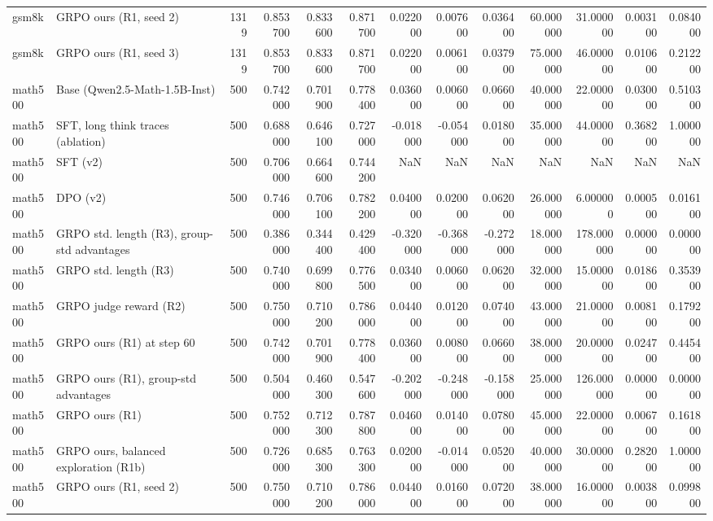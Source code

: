 \begin{table}
\begin{tabular}{llrrrrrrrrrrr}
gsm8k & GRPO ours (R1, seed 2) & 1319 & 0.853700 & 0.833600 & 0.871700 & 0.022000 & 0.007600 & 0.036400 & 60.000000 & 31.000000 & 0.003100 & 0.084000 \\
gsm8k & GRPO ours (R1, seed 3) & 1319 & 0.853700 & 0.833600 & 0.871700 & 0.022000 & 0.006100 & 0.037900 & 75.000000 & 46.000000 & 0.010600 & 0.212200 \\
math500 & Base (Qwen2.5-Math-1.5B-Inst) & 500 & 0.742000 & 0.701900 & 0.778400 & 0.036000 & 0.006000 & 0.066000 & 40.000000 & 22.000000 & 0.030000 & 0.510300 \\
math500 & SFT, long think traces (ablation) & 500 & 0.688000 & 0.646100 & 0.727000 & -0.018000 & -0.054000 & 0.018000 & 35.000000 & 44.000000 & 0.368200 & 1.000000 \\
math500 & SFT (v2) & 500 & 0.706000 & 0.664600 & 0.744200 & NaN & NaN & NaN & NaN & NaN & NaN & NaN \\
math500 & DPO (v2) & 500 & 0.746000 & 0.706100 & 0.782200 & 0.040000 & 0.020000 & 0.062000 & 26.000000 & 6.000000 & 0.000500 & 0.016100 \\
math500 & GRPO std. length (R3), group-std advantages & 500 & 0.386000 & 0.344400 & 0.429400 & -0.320000 & -0.368000 & -0.272000 & 18.000000 & 178.000000 & 0.000000 & 0.000000 \\
math500 & GRPO std. length (R3) & 500 & 0.740000 & 0.699800 & 0.776500 & 0.034000 & 0.006000 & 0.062000 & 32.000000 & 15.000000 & 0.018600 & 0.353900 \\
math500 & GRPO judge reward (R2) & 500 & 0.750000 & 0.710200 & 0.786000 & 0.044000 & 0.012000 & 0.074000 & 43.000000 & 21.000000 & 0.008100 & 0.179200 \\
math500 & GRPO ours (R1) at step 60 & 500 & 0.742000 & 0.701900 & 0.778400 & 0.036000 & 0.008000 & 0.066000 & 38.000000 & 20.000000 & 0.024700 & 0.445400 \\
math500 & GRPO ours (R1), group-std advantages & 500 & 0.504000 & 0.460300 & 0.547600 & -0.202000 & -0.248000 & -0.158000 & 25.000000 & 126.000000 & 0.000000 & 0.000000 \\
math500 & GRPO ours (R1) & 500 & 0.752000 & 0.712300 & 0.787800 & 0.046000 & 0.014000 & 0.078000 & 45.000000 & 22.000000 & 0.006700 & 0.161800 \\
math500 & GRPO ours, balanced exploration (R1b) & 500 & 0.726000 & 0.685300 & 0.763300 & 0.020000 & -0.014000 & 0.052000 & 40.000000 & 30.000000 & 0.282000 & 1.000000 \\
math500 & GRPO ours (R1, seed 2) & 500 & 0.750000 & 0.710200 & 0.786000 & 0.044000 & 0.016000 & 0.072000 & 38.000000 & 16.000000 & 0.003800 & 0.099800 \\

\end{tabular}
\end{table}
